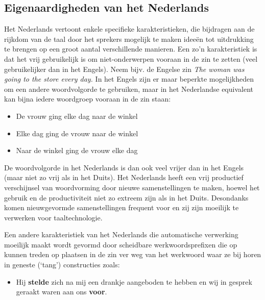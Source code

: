 \begin{multicols}{2}
\subsection{Eigenaardigheden van het Nederlands}

Het Nederlands vertoont enkele specifieke karakteristieken, die bijdragen aan de rijkdom van de taal door het sprekers mogelijk te maken idee{\"e}n tot uitdrukking te brengen op een groot aantal verschillende manieren. Een zo'n karakteristiek is dat het vrij gebruikelijk is om niet-onderwerpen vooraan in de zin te zetten (veel gebruikelijker dan in het Engels). Neem bijv. de Engelse zin \textit{The woman was going to the store every day.} In het Engels zijn er maar beperkte mogelijkheden om een andere woordvolgorde te gebruiken, maar in het Nederlandse equivalent kan bijna iedere woordgroep vooraan in de zin staan:


\begin{itemize}
\item De vrouw ging elke dag naar de winkel
\item    Elke dag ging de vrouw naar de winkel
\item    Naar de winkel ging de vrouw elke dag
\end{itemize}



    De woordvolgorde in het Nederlands is dan ook veel vrijer dan in het Engels (maar niet zo vrij als in het Duits).
    Het Nederlands heeft een vrij productief verschijnsel van woordvorming door nieuwe samenstellingen te maken, hoewel het gebruik en de productiviteit niet zo extreem zijn als in het Duits. Desondanks komen nieuwgevormde samenstellingen frequent voor en zij zijn moeilijk te verwerken voor taaltechnologie.



    Een andere karakteristiek van het Nederlands die automatische verwerking moeilijk maakt wordt gevormd door scheidbare werkwoordsprefixen die op kunnen treden op plaatsen in de zin ver weg van het werkwoord waar ze bij horen in geneste (`tang') constructies zoals:

\begin{itemize}
\item Hij \textbf{stelde} zich na mij een drankje aangeboden te hebben en wij in gesprek geraakt waren aan ons \textbf{voor}.
\end{itemize}


\end{multicols}
